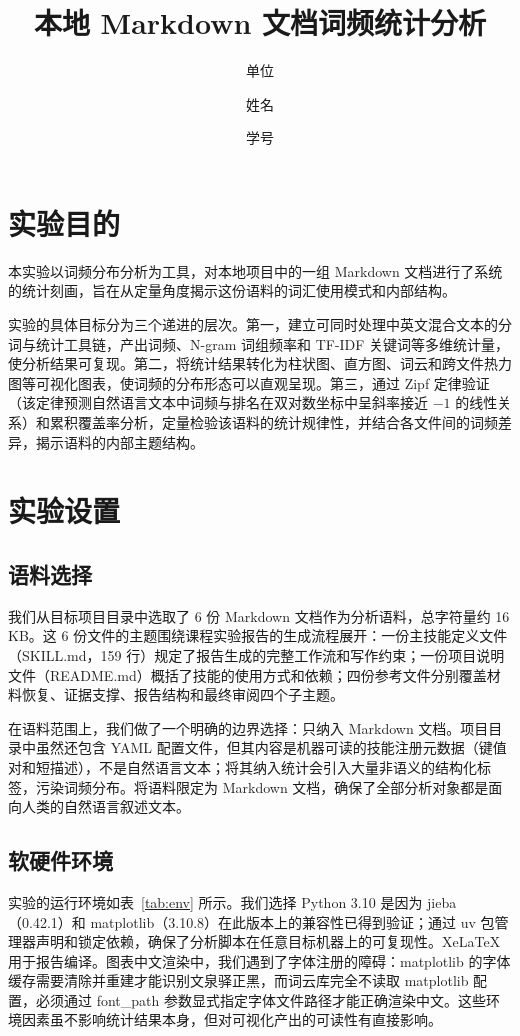 \documentclass[12pt,a4paper]{ctexart}
\title{本地 Markdown 文档词频统计分析}
\author{单位 \and 姓名 \and 学号}
\date{}
\begin{document}
\maketitle

\section{实验目的}

本实验以词频分布分析为工具，对本地项目中的一组 Markdown 文档进行了系统的统计刻画，旨在从定量角度揭示这份语料的词汇使用模式和内部结构。

实验的具体目标分为三个递进的层次。第一，建立可同时处理中英文混合文本的分词与统计工具链，产出词频、N-gram 词组频率和 TF-IDF 关键词等多维统计量，使分析结果可复现。第二，将统计结果转化为柱状图、直方图、词云和跨文件热力图等可视化图表，使词频的分布形态可以直观呈现。第三，通过 Zipf 定律验证（该定律预测自然语言文本中词频与排名在双对数坐标中呈斜率接近 \(-1\) 的线性关系）和累积覆盖率分析，定量检验该语料的统计规律性，并结合各文件间的词频差异，揭示语料的内部主题结构。

\section{实验设置}

\subsection{语料选择}

我们从目标项目目录中选取了 6 份 Markdown 文档作为分析语料，总字符量约 16 KB。这 6 份文件的主题围绕课程实验报告的生成流程展开：一份主技能定义文件（SKILL.md，159 行）规定了报告生成的完整工作流和写作约束；一份项目说明文件（README.md）概括了技能的使用方式和依赖；四份参考文件分别覆盖材料恢复、证据支撑、报告结构和最终审阅四个子主题。

在语料范围上，我们做了一个明确的边界选择：只纳入 Markdown 文档。项目目录中虽然还包含 YAML 配置文件，但其内容是机器可读的技能注册元数据（键值对和短描述），不是自然语言文本；将其纳入统计会引入大量非语义的结构化标签，污染词频分布。将语料限定为 Markdown 文档，确保了全部分析对象都是面向人类的自然语言叙述文本。

\subsection{软硬件环境}

实验的运行环境如表~\ref{tab:env} 所示。我们选择 Python 3.10 是因为 jieba（0.42.1）和 matplotlib（3.10.8）在此版本上的兼容性已得到验证；通过 uv 包管理器声明和锁定依赖，确保了分析脚本在任意目标机器上的可复现性。XeLaTeX 用于报告编译。图表中文渲染中，我们遇到了字体注册的障碍：matplotlib 的字体缓存需要清除并重建才能识别文泉驿正黑，而词云库完全不读取 matplotlib 配置，必须通过 font\_path 参数显式指定字体文件路径才能正确渲染中文。这些环境因素虽不影响统计结果本身，但对可视化产出的可读性有直接影响。
\end{document}
